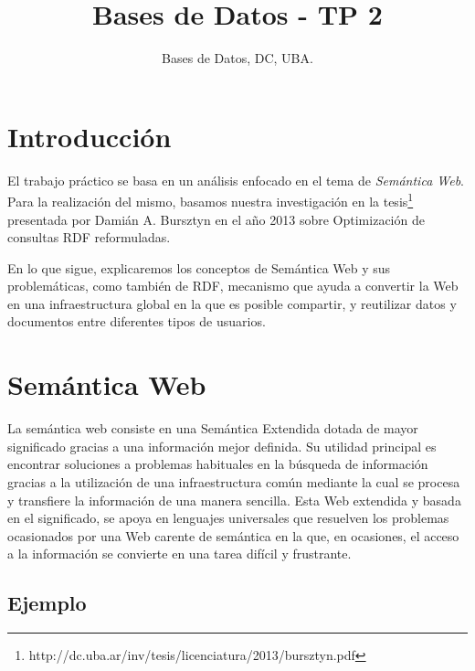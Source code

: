 \documentclass[10pt,a4paper]{article}
\title{Bases de Datos - TP 2}
\author{Bases de Datos, DC, UBA.}
\begin{document}



\maketitle

\tableofcontents

\newpage

\section{Introducción}

El trabajo práctico se basa en un análisis enfocado en el tema de \textit{Semántica Web}. Para la realización del mismo, basamos nuestra investigación en la tesis\footnote{http://dc.uba.ar/inv/tesis/licenciatura/2013/bursztyn.pdf} presentada por Damián A. Bursztyn en el año 2013 sobre Optimización de consultas RDF reformuladas.

En lo que sigue, explicaremos los conceptos de Semántica Web y sus problemáticas, como también de RDF, mecanismo que ayuda a convertir la Web en una infraestructura global en la que es posible compartir, y reutilizar datos y documentos entre diferentes tipos de usuarios.

\newpage
\section{Semántica Web}
La semántica web consiste en una Semántica Extendida dotada de mayor significado gracias a una información mejor definida. Su utilidad principal es encontrar soluciones a problemas habituales en la búsqueda de información gracias a la utilización de una infraestructura común mediante la cual se procesa y transfiere la información de una manera sencilla. Esta Web extendida y basada en el significado, se apoya en lenguajes universales que resuelven los problemas ocasionados por una Web carente de semántica en la que, en ocasiones, el acceso a la información se convierte en una tarea difícil y frustrante.

\subsection{Ejemplo}
\end{document}
